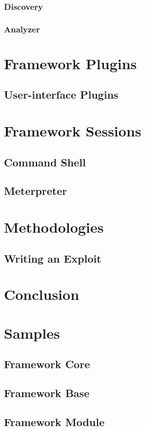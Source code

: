\documentclass{report}
\begin{document}
        \subsection{Discovery}
        \subsection{Analyzer}
\chapter{Framework Plugins}
\label{framework-plugins}

    \section{User-interface Plugins}
\chapter{Framework Sessions}
\label{framework-sessions}
    \section{Command Shell}
    \section{Meterpreter}
\chapter{Methodologies}
    \section{Writing an Exploit}
\chapter{Conclusion}

\appendix
\chapter{Samples}
    \section{Framework Core}
    \section{Framework Base}
    \section{Framework Module}
\end{document}
